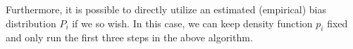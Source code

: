 \documentclass{article}
\begin{document}
Furthermore, it is possible to directly utilize an estimated (empirical) bias distribution $P_i$ if we so wish.
In this case, we can keep density function $p_i$ fixed and only run the first three steps in the above algorithm.



\end{document}
